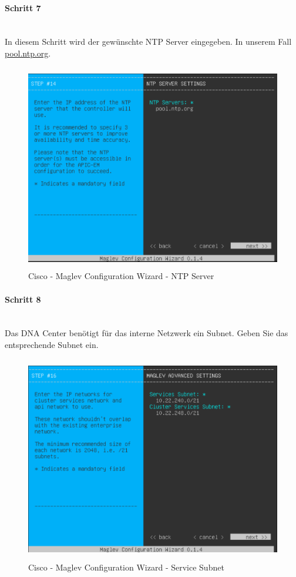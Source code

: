 \paragraph{Schritt 7}
~\\
In diesem Schritt wird der gewünschte NTP Server eingegeben. In unserem Fall \url{pool.ntp.org}.
\begin{figure}[H]
	\centering
	\includegraphics[height=9cm]{img/installguide/installguide-step14.PNG}
	\caption{Cisco - Maglev Configuration Wizard - NTP Server}
	\label{fig:installguide-dna-center-install-step-14}
\end{figure} 

\paragraph{Schritt 8}
~\\
Das DNA Center benötigt für das interne Netzwerk ein Subnet. Geben Sie das entsprechende Subnet ein.
\begin{figure}[H]
	\centering
	\includegraphics[height=9cm]{img/installguide/installguide-step16.PNG}
	\caption{Cisco - Maglev Configuration Wizard - Service Subnet}
	\label{fig:installguide-dna-center-install-step-16}
\end{figure} 

